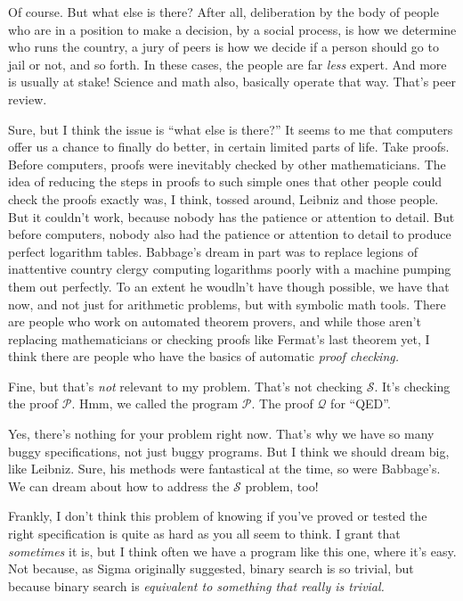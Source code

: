 \documentclass[sigplan]{acmart}
\begin{document}
 Of course.  But what else is there?  After
all, deliberation by the body of people who are in a position to make
a decision, by a social process, is how we determine who runs the country, a jury
of peers is how we decide if a person should go to jail or not, and so
forth.  In these cases, the people are far \emph{less} expert.  And
more is usually at stake!  Science and math also, basically operate
that way.  That's peer review.

  Sure, but I think the issue is ``what
else is there?''  It seems to me that computers offer us a chance to
finally do better, in certain limited parts of life.  Take proofs.
Before computers, proofs were inevitably checked by other
mathematicians.  The idea of reducing the steps in proofs to such
simple ones that other people could check the proofs exactly was, I
think, tossed around, Leibniz and those people.  But it couldn't work,
because nobody has the patience or attention to detail.  But before
computers, nobody also had the patience or attention to detail to
produce perfect logarithm tables.  Babbage's dream in part was to
replace legions of inattentive country clergy computing logarithms
poorly with a machine pumping them out perfectly.  To an extent he
woudln't have though possible, we have that now, and not just for
arithmetic problems, but with symbolic math tools.  There are people
who work on automated theorem provers, and while those aren't
replacing mathematicians or checking proofs like Fermat's last theorem
yet, I think there are people who have the basics of automatic
\emph{proof checking.}

   Fine, but that's \emph{not} relevant to
my problem.  That's not checking $\mathcal{S}$.  It's checking the
proof $\mathcal{P}$.  Hmm, we called the program $\mathcal{P}$.  The
proof $\mathcal{Q}$ for ``QED''.

  Yes, there's nothing for your problem
right now.  That's why we have so many buggy specifications, not just
buggy programs.  But I think we should dream big, like Leibniz.  Sure,
his methods were fantastical at the time, so were Babbage's.  We can
dream about how to address the $\mathcal{S}$ problem, too!


 Frankly, I don't think this problem of knowing if
you've proved or tested the right specification is quite as hard as
you all seem to think. I grant that \emph{sometimes} it is, but I
think often we have a program like this one, where it's easy.  Not
because, as Sigma originally suggested, binary search is so trivial,
but because binary search is \emph{equivalent to something that really
  is trivial.}
\end{document}
